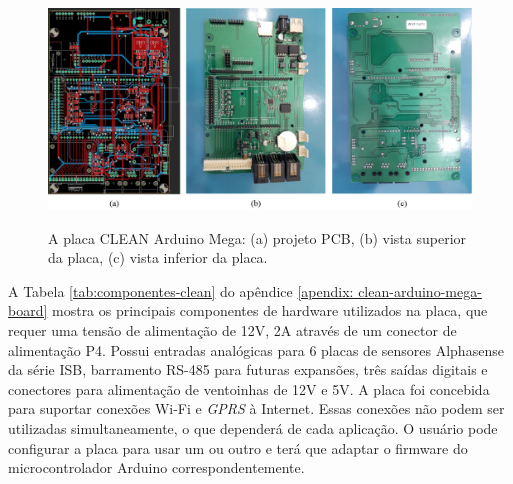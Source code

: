 \begin{figure}
    \centering
    \caption{A placa CLEAN Arduino Mega: (a) projeto PCB, (b) vista superior da placa, (c) vista inferior da placa.}
    \includegraphics[width=1\linewidth]{chapters//2-CLEAN/Figuras/CLEAN Arduino Mega Board.jpg}
    \label{fig:clean-arduino-mega-board}
\end{figure}

A Tabela \ref{tab:componentes-clean} do apêndice \ref{apendix: clean-arduino-mega-board} mostra os principais componentes de hardware utilizados na placa, que requer uma tensão de alimentação de 12V, 2A através de um conector de alimentação P4. Possui entradas analógicas para 6 placas de sensores Alphasense da série ISB, barramento RS-485 para futuras expansões, três saídas digitais e conectores para alimentação de ventoinhas de 12V e 5V. A placa foi concebida para suportar conexões Wi-Fi e \textit{GPRS} à Internet. Essas conexões não podem ser utilizadas simultaneamente, o que dependerá de cada aplicação. O usuário pode configurar a placa para usar um ou outro e terá que adaptar o firmware do microcontrolador Arduino correspondentemente.

